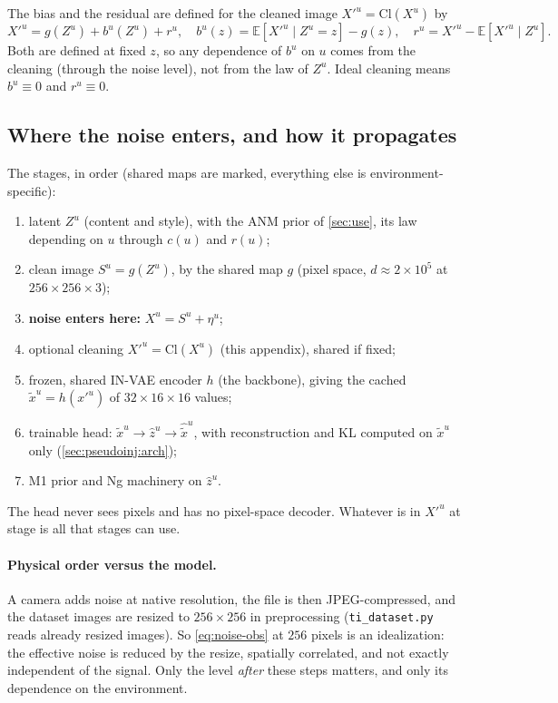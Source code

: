 The bias and the residual are defined for the cleaned image $X'^u=\mathrm{Cl}(X^u)$ by
\begin{equation}
X'^u = g(Z^u)+b^u(Z^u)+r^u,\quad b^u(z)=\mathbb E[X'^u\mid Z^u=z]-g(z),\quad
r^u=X'^u-\mathbb E[X'^u\mid Z^u].
\label{eq:cleaned-model}
\end{equation}
Both are defined at fixed $z$, so any dependence of $b^u$ on $u$ comes from the cleaning (through the
noise level), not from the law of $Z^u$. Ideal cleaning means $b^u\equiv0$ and $r^u\equiv0$.
\newpage
\subsection{Where the noise enters, and how it propagates}
\label{app:noise:prop}
The stages, in order (shared maps are marked, everything else is environment-specific):
\begin{enumerate}[label=(\arabic*),leftmargin=2.2em]
\item\label{item:stage1} latent $Z^u$ (content and style), with the ANM prior of \cref{sec:use}, its law
      depending on $u$ through $c(u)$ and $r(u)$;
\item\label{item:stage2} clean image $S^u=g(Z^u)$, by the shared map $g$ (pixel space,
      $d\approx2\times10^5$ at $256\times256\times3$);
\item\label{item:stage3} \textbf{noise enters here:} $X^u=S^u+\eta^u$;
\item\label{item:stage4} optional cleaning $X'^u=\mathrm{Cl}(X^u)$ (this appendix), shared if fixed;
\item\label{item:stage5} frozen, shared IN-VAE encoder $h$ (the backbone), giving the cached
      $\tilde x^u=h(x'^u)$ of $32\times16\times16$ values;
\item\label{item:stage6} trainable head: $\tilde x^u\to\hat z^u\to\hat{\tilde x}^u$, with reconstruction
      and KL computed on $\tilde x^u$ only (\cref{sec:pseudoinj:arch});
\item\label{item:stage7} M1 prior and Ng machinery on $\hat z^u$.
\end{enumerate}
The head never sees pixels and has no pixel-space decoder.
Whatever is in $X'^u$ at stage  is all
that stages  can use.

\paragraph{Physical order versus the model.} A camera adds noise at native resolution, the file is then
JPEG-compressed, and the dataset images are resized to $256\times256$ in preprocessing
(\texttt{ti\_dataset.py} reads already resized images). So \cref{eq:noise-obs} at $256$ pixels is an
idealization: the effective noise is reduced by the resize, spatially correlated, and not exactly
independent of the signal. Only the level \emph{after} these steps matters, and only its dependence on
the environment.

